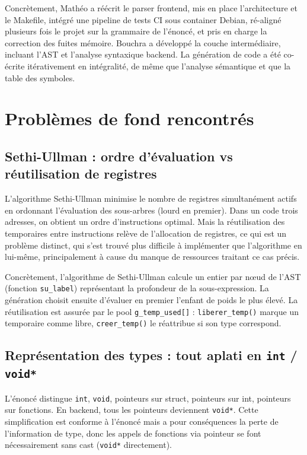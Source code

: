 \documentclass[12pt,a4paper]{article}
\begin{document}
Concrètement, Mathéo a réécrit le parser frontend, mis en place l'architecture et le Makefile, intégré une pipeline de tests CI sous container Debian, ré-aligné plusieurs fois le projet sur la grammaire de l'énoncé, et pris en charge la correction des fuites mémoire. Bouchra a développé la couche intermédiaire, incluant l'AST et l'analyse syntaxique backend. La génération de code a été co-écrite itérativement en intégralité, de même que l'analyse sémantique et que la table des symboles.

\section{Problèmes de fond rencontrés}

\subsection{Sethi-Ullman : ordre d'évaluation vs réutilisation de registres}
\label{sec:sethi}

L'algorithme Sethi-Ullman minimise le nombre de registres simultanément actifs en ordonnant l'évaluation des sous-arbres (lourd en premier). Dans un code trois adresses, on obtient un ordre d'instructions optimal. Mais la réutilisation des temporaires entre instructions relève de l'allocation de registres, ce qui est un problème distinct, qui s'est trouvé plus difficile à implémenter que l'algorithme en lui-même, principalement à cause du manque de ressources traitant ce cas précis.

Concrètement, l'algorithme de Sethi-Ullman calcule un entier par nœud de l'AST (fonction \texttt{su\_label}) représentant la profondeur de la sous-expression. La génération choisit ensuite d'évaluer en premier l'enfant de poids le plus élevé. La réutilisation est assurée par le pool \texttt{g\_temp\_used[]} : \texttt{liberer\_temp()} marque un temporaire comme libre, \texttt{creer\_temp()} le réattribue si son type correspond.

\subsection{Représentation des types : tout aplati en \texttt{int} / \texttt{void*}}

L'énoncé distingue \texttt{int}, \texttt{void}, pointeurs sur struct, pointeurs sur int, pointeurs sur fonctions. En backend, tous les pointeurs deviennent \texttt{void*}. Cette simplification est conforme à l'énoncé mais a pour conséquences la perte de l'information de type, donc les appels de fonctions via pointeur se font nécessairement sans cast (\texttt{void*} directement).
\end{document}

